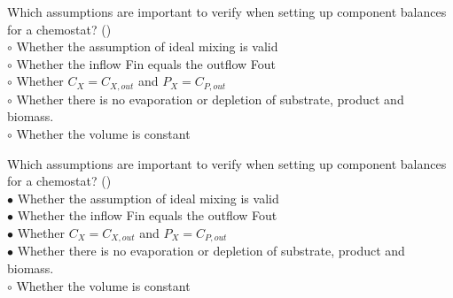 \documentclass[]{beamer}
\begin{document}
\begin{frame}[shrink] {}
\addtocounter{questions}{1}
\color{blue}
Which assumptions are important to verify when setting up component balances for a chemostat? ()\\
\color{black}
\setlength{\parindent}{-0.4cm}
{\color{red}$\circ$} Whether the assumption of ideal mixing is valid\\
{\color{red}$\circ$} Whether the inflow Fin equals the outflow Fout\\
{\color{red}$\circ$} Whether $C_X = C_{X,out}$ and $P_X = C_{P,out}$ \\
{\color{red}$\circ$} Whether there is no evaporation or depletion of substrate, product and biomass.\\
{\color{red}$\circ$} Whether the volume is constant  \\
\end{frame}
\begin{frame}[shrink] {}
\addtocounter{answers}{1}
\color{blue}
Which assumptions are important to verify when setting up component balances for a chemostat? ()\\
\color{black}
\setlength{\parindent}{-0.4cm}
{\color{red}$\bullet$} Whether the assumption of ideal mixing is valid\\
{\color{red}$\bullet$} Whether the inflow Fin equals the outflow Fout\\
{\color{red}$\bullet$} Whether $C_X = C_{X,out}$ and $P_X = C_{P,out}$ \\
{\color{red}$\bullet$} Whether there is no evaporation or depletion of substrate, product and biomass.\\
{\color{red}$\circ$} Whether the volume is constant  \\
\end{frame}
\end{document}
